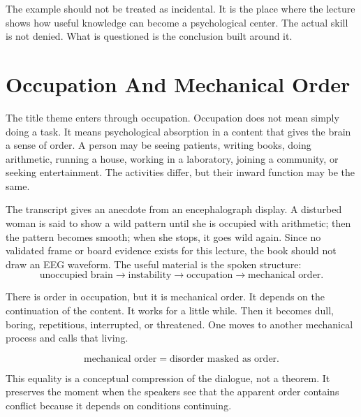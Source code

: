 \documentclass[11pt,oneside]{book}
\begin{document}
The example should not be treated as incidental. It is the place where the lecture shows how useful knowledge can become a psychological center. The actual skill is not denied. What is questioned is the conclusion built around it.

\section{Occupation And Mechanical Order}

The title theme enters through occupation. Occupation does not mean simply doing a task. It means psychological absorption in a content that gives the brain a sense of order. A person may be seeing patients, writing books, doing arithmetic, running a house, working in a laboratory, joining a community, or seeking entertainment. The activities differ, but their inward function may be the same.

The transcript gives an anecdote from an encephalograph display. A disturbed woman is said to show a wild pattern until she is occupied with arithmetic; then the pattern becomes smooth; when she stops, it goes wild again. Since no validated frame or board evidence exists for this lecture, the book should not draw an EEG waveform. The useful material is the spoken structure:
\begin{equation}
\text{unoccupied brain}
\longrightarrow
\text{instability}
\longrightarrow
\text{occupation}
\longrightarrow
\text{mechanical order}.
\end{equation}

There is order in occupation, but it is mechanical order. It depends on the continuation of the content. It works for a little while. Then it becomes dull, boring, repetitious, interrupted, or threatened. One moves to another mechanical process and calls that living.

\begin{equation}
\text{mechanical order}
=
\text{disorder masked as order}.
\end{equation}

This equality is a conceptual compression of the dialogue, not a theorem. It preserves the moment when the speakers see that the apparent order contains conflict because it depends on conditions continuing.
\end{document}
